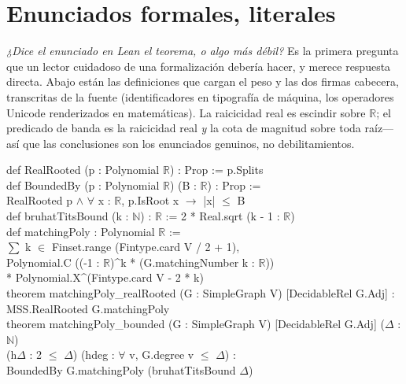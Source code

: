 \documentclass[11pt]{article}
\newcommand{\R}{\mathbb{R}}
\begin{document}
\appendix
\section{Enunciados formales, literales}
\label{sec:formal}

\emph{¿Dice el enunciado en Lean el teorema, o algo m\'as d\'ebil?} Es la primera
pregunta que un lector cuidadoso de una formalizaci\'on deber\'ia hacer, y merece
respuesta directa. Abajo est\'an las definiciones que cargan el peso y las dos
firmas cabecera, transcritas de la fuente (identificadores en tipograf\'ia de
m\'aquina, los operadores Unicode renderizados en matem\'aticas). La raicicidad real
es escindir sobre $\R$; el predicado de banda es la raicicidad real \emph{y} la cota
de magnitud sobre toda ra\'iz---as\'i que las conclusiones son los enunciados
genuinos, no debilitamientos.

\begin{tcolorbox}[colframe=ggteal,colback=ggband!25,arc=2pt,boxrule=0.8pt,left=8pt,right=8pt]
\ttfamily\small\setlength{\parindent}{0pt}
def RealRooted (p : Polynomial $\R$) : Prop := p.Splits\\[2pt]
def BoundedBy (p : Polynomial $\R$) (B : $\R$) : Prop :=\\
\hspace*{1.5em}RealRooted p $\wedge$ $\forall$ x : $\R$, p.IsRoot x $\rightarrow$ |x| $\leq$ B\\[2pt]
def bruhatTitsBound (k : $\mathbb{N}$) : $\R$ := 2 * Real.sqrt (k - 1 : $\R$)\\[4pt]
def matchingPoly : Polynomial $\R$ :=\\
\hspace*{1.5em}$\sum$ k $\in$ Finset.range (Fintype.card V / 2 + 1),\\
\hspace*{3em}Polynomial.C ((-1 : $\R$)\^{}k * (G.matchingNumber k : $\R$))\\
\hspace*{3em}* Polynomial.X\^{}(Fintype.card V - 2 * k)\\[6pt]
theorem matchingPoly\_realRooted (G : SimpleGraph V) [DecidableRel G.Adj] :\\
\hspace*{1.5em}MSS.RealRooted G.matchingPoly\\[4pt]
theorem matchingPoly\_bounded (G : SimpleGraph V) [DecidableRel G.Adj] ($\Delta$ : $\mathbb{N}$)\\
\hspace*{1.5em}(h$\Delta$ : 2 $\leq$ $\Delta$) (hdeg : $\forall$ v, G.degree v $\leq$ $\Delta$) :\\
\hspace*{1.5em}BoundedBy G.matchingPoly (bruhatTitsBound $\Delta$)
\end{tcolorbox}
\end{document}
